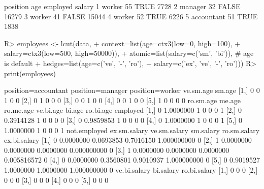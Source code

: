 \begin{Schunk}
% --begin: "lcut.data.frame2"
\begin{Soutput}
    position age employed salary
1     worker  55     TRUE   7728
2    manager  32    FALSE  16279
3     worker  41    FALSE  15044
4     worker  52     TRUE   6226
5 accountant  51     TRUE   1838
\end{Soutput}
\begin{Sinput}
R> employees <- lcut(data,
+                    context=list(age=ctx3(low=0, high=100),
+                                 salary=ctx3(low=500, high=50000)),
+                    atomic=list(salary=c('sm', 'bi')), # age is default
+                    hedges=list(age=c('ve', '-', 'ro'),
+                                salary=c('ex', 've', '-', 'ro')))
R> print(employees)
\end{Sinput}
\begin{Soutput}
     position=accountant position=manager position=worker ve.sm.age sm.age
[1,]                   0                0               1         0      0
[2,]                   0                1               0         0      0
[3,]                   0                0               1         0      0
[4,]                   0                0               1         0      0
[5,]                   1                0               0         0      0
     ro.sm.age    me.age ro.me.age ve.bi.age bi.age ro.bi.age employed
[1,]         0 1.0000000         1         0      0         0        1
[2,]         0 0.3914128         1         0      0         0        0
[3,]         0 0.9859853         1         0      0         0        0
[4,]         0 1.0000000         1         0      0         0        1
[5,]         0 1.0000000         1         0      0         0        1
     not.employed ex.sm.salary ve.sm.salary sm.salary ro.sm.salary ex.bi.salary
[1,]            0    0.0000000    0.0693853 0.7016150  1.000000000            0
[2,]            1    0.0000000    0.0000000 0.0000000  0.000000000            0
[3,]            1    0.0000000    0.0000000 0.0000000  0.005816572            0
[4,]            0    0.0000000    0.3560801 0.9010937  1.000000000            0
[5,]            0    0.9019527    1.0000000 1.0000000  1.000000000            0
     ve.bi.salary bi.salary ro.bi.salary
[1,]            0         0            0
[2,]            0         0            0
[3,]            0         0            0
[4,]            0         0            0
[5,]            0         0            0
\end{Soutput}
%
% --end: "lcut.data.frame2"
\end{Schunk}
